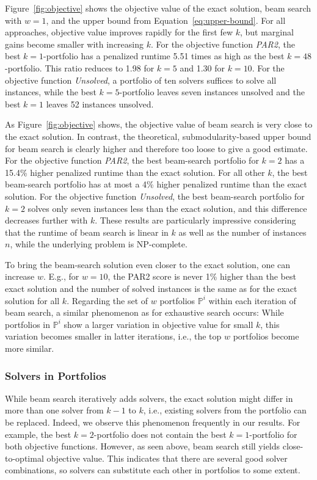 \documentclass[conference]{IEEEtran}
\begin{document}
Figure~\ref{fig:objective} shows the objective value of the exact solution, beam search with $w=1$, and the upper bound from Equation~\ref{eq:upper-bound}.
For all approaches, objective value improves rapidly for the first few $k$, but marginal gains become smaller with increasing $k$.
For the objective function \emph{PAR2}, the best $k=1$-portfolio has a penalized runtime 5.51 times as high as the best
$k=48$-portfolio.
This ratio reduces to 1.98 for $k=5$ and 1.30 for $k=10$.
For the objective function \emph{Unsolved}, a portfolio of ten solvers suffices to solve all instances, while the best $k=5$-portfolio leaves seven instances unsolved and the best $k=1$ leaves 52 instances unsolved.

As Figure~\ref{fig:objective} shows, the objective value of beam search is very close to the exact solution.
In contrast, the theoretical, submodularity-based upper bound for beam search is clearly higher and therefore too loose to give a good estimate.
For the objective function \emph{PAR2}, the best beam-search portfolio for $k=2$ has a 15.4\% higher penalized runtime than the exact solution.
For all other $k$, the best beam-search portfolio has at most a 4\% higher penalized runtime than the exact solution.
For the objective function \emph{Unsolved}, the best beam-search portfolio for $k=2$ solves only seven instances less than the exact solution, and this difference decreases further with $k$.
These results are particularly impressive considering that the runtime of beam search is linear in $k$ as well as the number of instances $n$, while the underlying problem is NP-complete.

To bring the beam-search solution even closer to the exact solution, one can increase $w$.
E.g., for $w=10$, the PAR2 score is never 1\% higher than the best exact solution and the number of solved instances is the same as for the exact solution for all $k$.
Regarding the set of $w$ portfolios $\mathbb{P}^i$ within each iteration of beam search, a similar phenomenon as for exhaustive search occurs:
While portfolios in $\mathbb{P}^i$ show a larger variation in objective value for small $k$, this variation becomes smaller in latter iterations, i.e., the top $w$ portfolios become more similar.

\subsubsection{Solvers in Portfolios}

While beam search iteratively adds solvers, the exact solution might differ in more than one solver from $k-1$ to $k$, i.e., existing solvers from the portfolio can be replaced.
Indeed, we observe this phenomenon frequently in our results.
For example, the best $k=2$-portfolio does not contain the best $k=1$-portfolio for both objective functions.
However, as seen above, beam search still yields close-to-optimal objective value.
This indicates that there are several good solver combinations, so solvers can substitute each other in portfolios to some extent.
\end{document}
